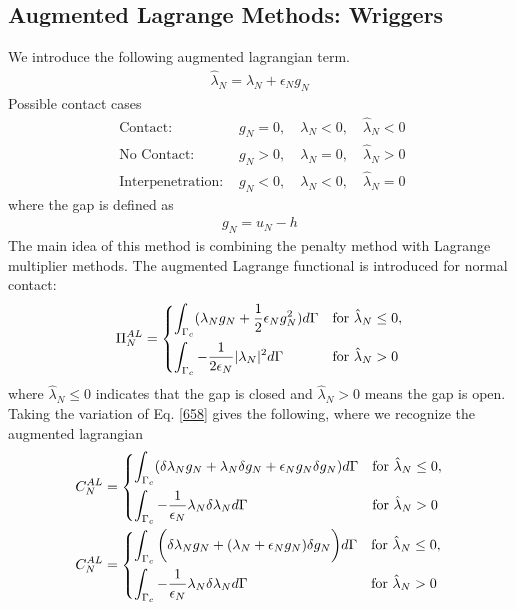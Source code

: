 \documentclass[12pt,3p]{article}
\begin{document}
\subsection{Augmented Lagrange Methods: Wriggers}
We introduce the following augmented lagrangian term.
\begin{align*}
\hat{\lambda}_N = \lambda_N + \epsilon_N g_N
\end{align*}
Possible contact cases
\begin{equation}
\begin{aligned}
\text { Contact: } & g_N = 0, \quad \lambda_N < 0, \quad \hat{\lambda}_N < 0 \\
\text { No Contact: } & g_N > 0, \quad \lambda_N = 0, \quad \hat{\lambda}_N > 0 \\
\text { Interpenetration: } & g_N < 0, \quad \lambda_N < 0, \quad \hat{\lambda}_N = 0 
\end{aligned}
\end{equation}
where the gap is defined as 
\begin{align*}
g_N = u_N - h
\end{align*}
The main idea of this method is combining the penalty method with Lagrange multiplier methods. The augmented Lagrange functional is introduced for normal contact: 
\begin{align}\label{658}
\Pi_{N}^{AL} = 
\begin{dcases}
    \int_{\Gamma_c} (\lambda_N g_N + \frac{1}{2} \epsilon_N g_N^2) d \Gamma & \text{for } \hat{\lambda}_N \leq 0, \\
    \int_{\Gamma_c} -\frac{1}{2 \epsilon_N} |\lambda_N|^2 d \Gamma               & \text{for } \hat{\lambda}_N > 0
\end{dcases}
\end{align}
where $ \hat{\lambda}_N \leq 0$ indicates that the gap is closed and $\hat{\lambda}_N > 0$ means the gap is open. 
Taking the variation of Eq. \ref{658} gives the following, where we recognize the augmented lagrangian 
\begin{align*}
C_{N}^{AL} &= 
\begin{dcases}
    \int_{\Gamma_c} (\delta \lambda_N g_N + \lambda_N \delta g_N + \epsilon_N g_N \delta g_N) d \Gamma & \text{for } \hat{\lambda}_N \leq 0, \\
    \int_{\Gamma_c} -\frac{1}{\epsilon_N} \lambda_N \delta \lambda_N d \Gamma               & \text{for } \hat{\lambda}_N > 0
\end{dcases} \\
C_{N}^{AL} &= 
\begin{dcases}
    \int_{\Gamma_c} \bigg( \delta \lambda_N g_N + (\lambda_N + \epsilon_N g_N) \delta g_N \bigg) d \Gamma & \text{for } \hat{\lambda}_N \leq 0, \\
    \int_{\Gamma_c} -\frac{1}{\epsilon_N} \lambda_N \delta \lambda_N d \Gamma               & \text{for } \hat{\lambda}_N > 0
\end{dcases} 
\end{align*}
\end{document}
